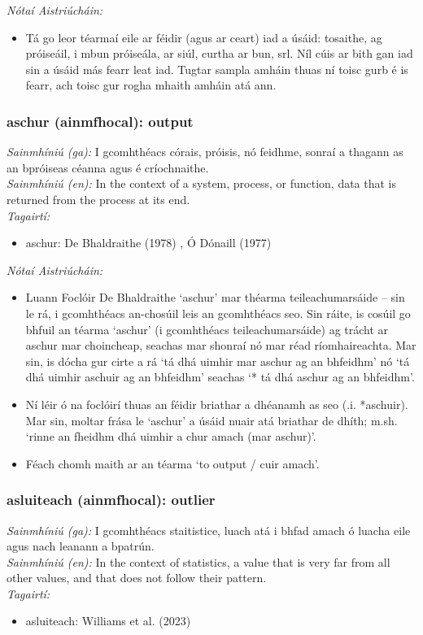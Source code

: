 \documentclass{article}
\begin{document}
 \noindent \textit{Nótaí Aistriúcháin:}
\begin{itemize}
	\item Tá go leor téarmaí eile ar féidir (agus ar ceart) iad a úsáid: tosaithe, ag próiseáil, i mbun próiseála, ar siúl, curtha ar bun, srl. Níl cúis ar bith gan iad sin a úsáid más fearr leat iad. Tugtar sampla amháin thuas ní toisc gurb é is fearr, ach toisc gur rogha mhaith amháin atá ann.
\end{itemize}


\subsubsection*{aschur (ainmfhocal): output}
 \noindent \textit{Sainmhíniú (ga):} I gcomhthéacs córais, próisis, nó feidhme, sonraí a thagann as an bpróiseas céanna agus é críochnaithe.
\\
 \noindent \textit{Sainmhíniú (en):} In the context of a system, process, or function, data that is returned from the process at its end.
\\
 \noindent \textit{Tagairtí:}
\begin{itemize}
	\item aschur: De Bhaldraithe (1978) \cite{de-bhaldraithe}, Ó Dónaill (1977) \cite{odonaill}
\end{itemize}

 \noindent \textit{Nótaí Aistriúcháin:}
\begin{itemize}
	\item Luann Foclóir De Bhaldraithe `aschur' mar théarma teileachumarsáide -- sin le rá, i gcomhthéacs an-chosúil leis an gcomhthéacs seo. Sin ráite, is cosúil go bhfuil an téarma `aschur' (i gcomhthéacs teileachumarsáide) ag trácht ar aschur mar choincheap, seachas mar shonraí nó mar réad ríomhaireachta. Mar sin, is dócha gur cirte a rá `tá dhá uimhir mar aschur ag an bhfeidhm' nó `tá dhá uimhir aschuir ag an bhfeidhm' seachas `* tá dhá aschur ag an bhfeidhm'.
	\item Ní léir ó na foclóirí thuas an féidir briathar a dhéanamh as seo (.i. *aschuir). Mar sin, moltar frása le `aschur' a úsáid nuair atá briathar de dhíth; m.sh. `rinne an fheidhm dhá uimhir a chur amach (mar aschur)'.
	\item Féach chomh maith ar an téarma `to output / cuir amach'.
\end{itemize}


\subsubsection*{asluiteach (ainmfhocal): outlier}
 \noindent \textit{Sainmhíniú (ga):} I gcomhthéacs staitistice, luach atá i bhfad amach ó luacha eile agus nach leanann a bpatrún.
\\
 \noindent \textit{Sainmhíniú (en):} In the context of statistics, a value that is very far from all other values, and that does not follow their pattern.
\\
 \noindent \textit{Tagairtí:}
\begin{itemize}
	\item asluiteach: Williams et al. (2023) \cite{storchiste}
\end{itemize}
\end{document}
